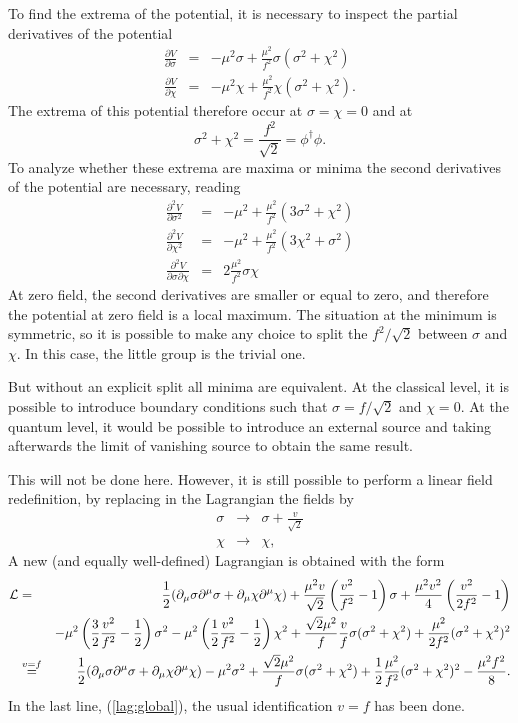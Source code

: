 \documentclass[final,12pt,3p,longtitle]{elsarticle}
\newcommand*{\La}{{\cal{L}}}
\newcommand*{\no}{\noindent}
\newcommand*{\bea}{\begin{eqnarray}}
\newcommand*{\eea}{\end{eqnarray}}
\newcommand*{\be}{\begin{equation}}
\newcommand*{\ee}{\end{equation}}
\newcommand*{\pd}{\partial}
\newcommand*{\pdm}{\pd_{\mu}}
\newcommand*{\pref}[1]{(\ref{#1})}
\newcommand*{\nn}{\nonumber}
\newcommand*{\1}{1\!\!\!\bot}
\begin{document}
To find the extrema of the potential, it is necessary to inspect the partial derivatives of the potential
\bea
\frac{\pd V}{\pd\sigma}&=&-\mu^2\sigma+\frac{\mu^2}{f^2}\sigma(\sigma^2+\chi^2)\nn\\
\frac{\pd V}{\pd\chi}&=&-\mu^2\chi+\frac{\mu^2}{f^2}\chi(\sigma^2+\chi^2)\nn.
\eea
\no The extrema of this potential therefore occur at $\sigma=\chi=0$ and at 
\be
\sigma^2+\chi^2=\frac{f^2}{\sqrt{2}}=\phi^\dagger\phi\nn.
\ee
\no To analyze whether these extrema are maxima or minima the second derivatives of the potential are necessary, reading
\bea
\frac{\pd^2 V}{\pd\sigma^2}&=&-\mu^2+\frac{\mu^2}{f^2}(3\sigma^2+\chi^2)\nn\\
\frac{\pd^2 V}{\pd\chi^2}&=&-\mu^2+\frac{\mu^2}{f^2}(3\chi^2+\sigma^2)\nn\\
\frac{\pd^2 V}{\pd\sigma\pd\chi}&=&2\frac{\mu^2}{f^2}\sigma\chi\nn
\eea
\no At zero field, the second derivatives are smaller or equal to zero, and therefore the potential at zero field is a local maximum. The situation at the minimum is symmetric, so it is possible to make any choice to split the $f^2/\sqrt{2}$ between $\sigma$ and $\chi$. In this case, the little group is the trivial one.

But without an explicit split all minima are equivalent. At the classical level, it is possible to introduce boundary conditions such that $\sigma=f/\sqrt{2}$ and $\chi=0$. At the quantum level, it would be possible to introduce an external source and taking afterwards the limit of vanishing source to obtain the same result.

This will not be done here. However, it is still possible to perform a linear field redefinition, by replacing in the Lagrangian the fields by
\bea
\sigma&\to&\sigma+\frac{v}{\sqrt{2}}\label{sigmashift}\\
\chi&\to&\chi\nn,
\eea
\no A new (and equally well-defined) Lagrangian is obtained with the form
\bea
\La&=&\frac{1}{2}(\pdm\sigma\pd^\mu\sigma+\pdm\chi\pd^\mu\chi)+\frac{\mu^2v}{\sqrt{2}}\left(\frac{v^2}{f^2}-1\right)\sigma+\frac{\mu^2v^2}{4}\left(\frac{v^2}{2f^2}-1\right)\label{beforeid2}\\
&&-\mu^2\left(\frac{3}{2}\frac{v^2}{f^2}-\frac{1}{2}\right)\sigma^2-\mu^2\left(\frac{1}{2}\frac{v^2}{f^2}-\frac{1}{2}\right)\chi^2+\frac{\sqrt{2}\mu^2}{f}\frac{v}{f}\sigma(\sigma^2+\chi^2)+\frac{\mu^2}{2f^2}(\sigma^2+\chi^2)^2\nn\\
&\stackrel{v=f}{=}&\frac{1}{2}(\pdm\sigma\pd^\mu\sigma+\pdm\chi\pd^\mu\chi)-\mu^2\sigma^2+\frac{\sqrt{2}\mu^2}{f}\sigma(\sigma^2+\chi^2)+\frac{1}{2}\frac{\mu^2}{f^2}(\sigma^2+\chi^2)^2-\frac{\mu^2f^2}{8}\label{lag:global}.
\eea
\no In the last line, \pref{lag:global}, the usual \cite{Bohm:2001yx} identification $v=f$ has been done.
\end{document}
